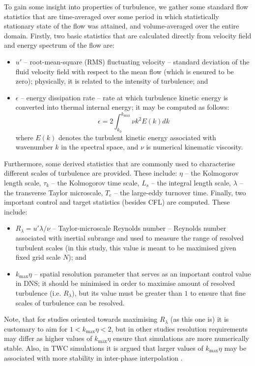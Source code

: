 \documentclass{pracamgren}
\begin{document}
To gain some insight into properties of turbulence, we gather some standard flow statistics that are time-averaged over some period in which statistically stationary state of the flow was attained, and volume-averaged over the entire domain.
Firstly, two basic statistics that are calculated directly from velocity field and energy spectrum of the flow are: 
\begin{itemize}
\item $u'$ -- root-mean-square (RMS) fluctuating velocity -- standard deviation of the fluid velocity field with respect to the mean flow (which is ensured to be zero); physically, it is related to the intensity of turbulence; and
\item $\epsilon$ -- energy dissipation rate -- rate at which turbulence kinetic energy is converted into thermal internal energy; it may be computed as follows:
\begin{equation}
\epsilon  = 2 \int_{k_{0}}^{k_{\max}} \nu k^{2} E(k) dk
\label{eqn:eps}
\end{equation}
where $E(k)$ denotes the turbulent kinetic energy associated with wavenumber $k$ in the spectral space, and $\nu$ is numerical kinematic viscosity.  
\end{itemize}
Furthermore, some derived statistics that are commonly used to characterise different scales of turbulence are provided. These include: $\eta$ -- the Kolmogorov length scale, $\tau_{k}$ -- the Kolmogorov time scale, $L_{s}$ -- the integral length scale, $\lambda$ -- the transverse Taylor microscale, $T_{e}$ -- the large-eddy turnover time.
Finally, two important control and target statistics (besides CFL) are computed. These include:
\begin{itemize}
\item $R_{\lambda} = u' \lambda / \nu$ -- Taylor-microscale Reynolds number -- Reynolds number associated with inertial subrange and used to measure the range of resolved turbulent scales (in this study, this value is meant to be maximised given fixed grid scale $N$); and
\item $k_{\max} \eta$ -- spatial resolution parameter that serves as an important control value in DNS; it should be minimised in order to maximise amount of resolved turbulence (i.e. $R_{\lambda}$), but its value must be greater than $1$ to ensure that fine scales of turbulence can be resolved.
\end{itemize}
Note, that for studies oriented towards maximising $R_{\lambda}$ (as this one is) it is customary to aim for $1 < k_{\max} \eta < 2$, but in other studies resolution requirements may differ \parencite{Buaria2019} as higher values of $k_{\max} \eta$ ensure that simulations are more numerically stable.
Also, in TWC simulations it is argued that larger values of $k_{\max} \eta$ may be associated with more stability in inter-phase interpolation \parencite[see][]{Rosa2020}.   
\end{document}
